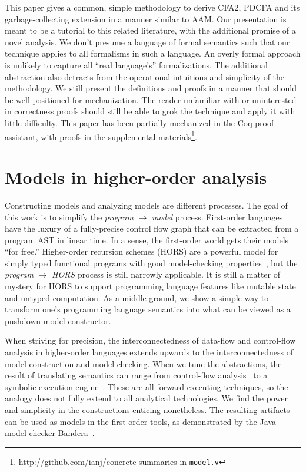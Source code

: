 This paper gives a common, simple methodology to derive CFA2, PDCFA and its garbage-collecting extension in a manner similar to AAM.
%
Our presentation is meant to be a tutorial to this related literature, with the additional promise of a novel analysis.
%
We don't presume a language of formal semantics such that our technique applies to all formalisms in such a language.
%
An overly formal approach is unlikely to capture all ``real language's'' formalizations.
%
The additional abstraction also detracts from the operational intuitions and simplicity of the methodology.
%
We still present the definitions and proofs in a manner that should be well-positioned for mechanization.
%
The reader unfamiliar with or uninterested in correctness proofs should still be able to grok the technique and apply it with little difficulty.
%
This paper has been partially mechanized in the Coq proof assistant, with proofs in the supplemental materials\footnote{\url{http://github.com/ianj/concrete-summaries} in \texttt{model.v}}.

\section{Models in higher-order analysis}

Constructing models and analyzing models are different processes.
%
The goal of this work is to simplify the \textit{program} $\to$ \textit{model} process.
%
First-order languages have the luxury of a fully-precise control flow graph that can be extracted from a program AST in linear time.
%
In a sense, the first-order world gets their models ``for free.''
%
Higher-order recursion schemes (HORS) are a powerful model for simply typed functional programs with good model-checking properties~\citep{dvanhorn:Ong2006ModelChecking}, but the \textit{program} $\to$ \textit{HORS} process is still narrowly applicable.
%
It is still a matter of mystery for HORS to support programming language features like mutable state and untyped computation.
As a middle ground, we show a simple way to transform one's programming language semantics into what can be viewed as a pushdown model constructor.

When striving for precision, the interconnectedness of data-flow and control-flow analysis in higher-order languages extends upwards to the interconnectedness of model construction and model-checking.
%
When we tune the abstractions, the result of translating semantics can range from control-flow analysis~\citep{dvanhorn:VanHorn2010Abstracting} to a symbolic execution engine~\citep{dvanhorn:TobinHochstadt2012Higherorder}.
%
These are all forward-executing techniques, so the analogy does not fully extend to all analytical technologies.
%
We find the power and simplicity in the constructions enticing nonetheless.
%
The resulting artifacts can be used as models in the first-order tools, as demonstrated by the Java model-checker Bandera~\citep{ianjohnson:bandera}.

